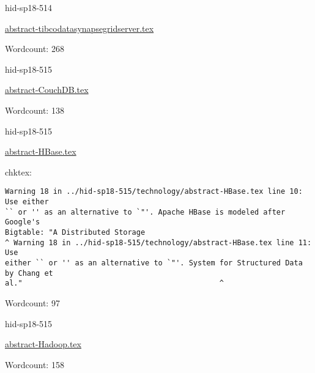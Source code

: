 

\begin{IU}

hid-sp18-514

\href{https://github.com/cloudmesh-community/hid-sp18-514/blob/master//technology/abstract-tibcodatasynapsegridserver.tex}{abstract-tibcodatasynapsegridserver.tex}

 

Wordcount: 268

\end{IU}



\begin{IU}

hid-sp18-515

\href{https://github.com/cloudmesh-community/hid-sp18-515/blob/master//technology/abstract-CouchDB.tex}{abstract-CouchDB.tex}

 

Wordcount: 138

\end{IU}



\begin{IU}

hid-sp18-515

\href{https://github.com/cloudmesh-community/hid-sp18-515/blob/master//technology/abstract-HBase.tex}{abstract-HBase.tex}

 
chktex:
\begin{tiny}
\begin{verbatim}
Warning 18 in ../hid-sp18-515/technology/abstract-HBase.tex line 10: Use either
`` or '' as an alternative to `"'. Apache HBase is modeled after Google's
Bigtable: "A Distributed Storage
^ Warning 18 in ../hid-sp18-515/technology/abstract-HBase.tex line 11: Use
either `` or '' as an alternative to `"'. System for Structured Data by Chang et
al."                                             ^
\end{verbatim}
\end{tiny}

Wordcount: 97

\end{IU}



\begin{IU}

hid-sp18-515

\href{https://github.com/cloudmesh-community/hid-sp18-515/blob/master//technology/abstract-Hadoop.tex}{abstract-Hadoop.tex}

 

Wordcount: 158

\end{IU}


